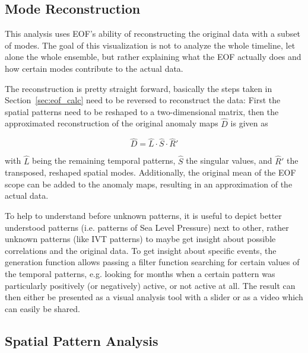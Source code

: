\subsection{Mode Reconstruction} %
\label{sec:Mode Reconstruction}


This analysis uses EOF's ability of reconstructing the original data with a subset of modes.  
The goal of this visualization is not to analyze the whole timeline, let alone the whole ensemble, but rather explaining what the EOF actually does and how certain modes contribute to the actual data. 

The reconstruction is pretty straight forward, basically the steps taken in Section~\ref{sec:eof_calc} need to be reversed to reconstruct the data: 
First the spatial patterns need to be reshaped to a two-dimensional matrix, then the approximated reconstruction of the original anomaly maps $\hat{D}$ is given as 

\begin{equation}
  \hat{D} = \hat{L} \cdot \hat{S} \cdot \hat{R}'
  \label{eq:eof reconstruction}
\end{equation}

with $\hat{L}$ being the remaining temporal patterns, $\hat{S}$ the singular values, and $\hat{R}'$ the transposed, reshaped spatial modes. 
Additionally, the original mean of the EOF scope can be added to the anomaly maps, resulting in an approximation of the actual data. 

To help to understand before unknown patterns, it is useful to depict better understood patterns (i.e. patterns of Sea Level Pressure) next to other, rather unknown patterns (like IVT patterns) to maybe get insight about possible correlations and the original data. 
To get insight about specific events, the generation function allows passing a filter function searching for certain values of the temporal patterns, e.g. looking for months when a certain pattern was particularly positively (or negatively) active, or not active at all. 
The result can then either be presented as a visual analysis tool with a slider or as a video which can easily be shared.


\subsection{Spatial Pattern Analysis}
\label{sec:mode comparison}


